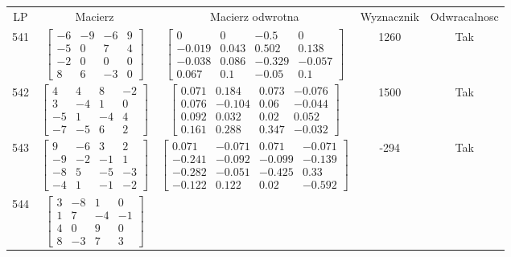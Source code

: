 \documentclass[a4paper,12pt]{article}
\begin{document}
\bgroup {} \vspace{0.2in} \begin{tabular}{c c c c c}
LP & Macierz & Macierz odwrotna & Wyznacznik & Odwracalnosc\\
541
&
$\begin{bmatrix} -6 & -9 & -6 & 9 \\ -5 & 0 & 7 & 4 \\ -2 & 0 & 0 & 0 \\ 8 & 6 & -3 & 0 \end{bmatrix}$
&
$\begin{bmatrix} 0 & 0 & -0.5 & 0 \\ -0.019 & 0.043 & 0.502 & 0.138 \\ -0.038 & 0.086 & -0.329 & -0.057 \\ 0.067 & 0.1 & -0.05 & 0.1 \end{bmatrix}$
&
1260
&
Tak
\\
542
&
$\begin{bmatrix} 4 & 4 & 8 & -2 \\ 3 & -4 & 1 & 0 \\ -5 & 1 & -4 & 4 \\ -7 & -5 & 6 & 2 \end{bmatrix}$
&
$\begin{bmatrix} 0.071 & 0.184 & 0.073 & -0.076 \\ 0.076 & -0.104 & 0.06 & -0.044 \\ 0.092 & 0.032 & 0.02 & 0.052 \\ 0.161 & 0.288 & 0.347 & -0.032 \end{bmatrix}$
&
1500
&
Tak
\\
543
&
$\begin{bmatrix} 9 & -6 & 3 & 2 \\ -9 & -2 & -1 & 1 \\ -8 & 5 & -5 & -3 \\ -4 & 1 & -1 & -2 \end{bmatrix}$
&
$\begin{bmatrix} 0.071 & -0.071 & 0.071 & -0.071 \\ -0.241 & -0.092 & -0.099 & -0.139 \\ -0.282 & -0.051 & -0.425 & 0.33 \\ -0.122 & 0.122 & 0.02 & -0.592 \end{bmatrix}$
&
-294
&
Tak
\\
544
&
$\begin{bmatrix} 3 & -8 & 1 & 0 \\ 1 & 7 & -4 & -1 \\ 4 & 0 & 9 & 0 \\ 8 & -3 & 7 & 3 \end{bmatrix}$

\end{tabular}
\end{document}
